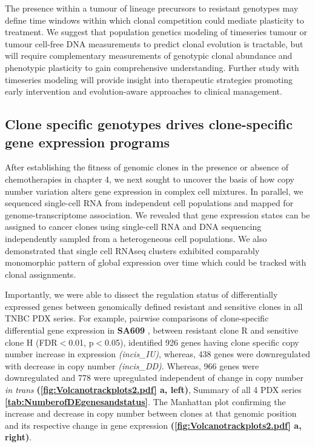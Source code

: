 The presence within a tumour of lineage precursors to resistant genotypes may define time windows within which clonal competition could mediate plasticity to treatment. We suggest that population genetics modeling of timeseries tumour or tumour cell-free DNA measurements to predict clonal evolution is tractable, but will require complementary measurements of genotypic clonal abundance and phenotypic plasticity to gain comprehensive understanding. Further study with timeseries modeling will provide insight into therapeutic strategies promoting early intervention and evolution-aware approaches to clinical management\cite{Acar2020-tf}.
 

\subsection{Clone specific genotypes drives clone-specific gene expression programs}

After establishing the fitness of genomic clones in the presence or absence of chemotherapies in chapter 4, we next sought to uncover the basis of how copy number variation alters gene expression in complex cell mixtures. In parallel, we sequenced single-cell RNA from independent cell populations and mapped for genome-transcriptome association. 
We revealed that gene expression states can be assigned to cancer clones using single-cell RNA and DNA sequencing independently sampled from a heterogeneous cell populations. We also demonstrated that single cell RNAseq clusters exhibited comparably monomorphic pattern of global expression over time which could be tracked with clonal assignments.




Importantly, we were able to dissect the regulation status of  differentially expressed genes between genomically defined resistant and sensitive clones in all TNBC PDX series. For example, pairwise comparisons of clone-specific differential gene expression in \textbf{SA609} , between resistant clone R and sensitive clone H (FDR$<$0.01, p$<$0.05), identified 926 genes having clone specific copy number increase in expression \textit{(incis\_IU)}, whereas, 438 genes were downregulated with decrease in copy number \textit{(incis\_DD)}. Whereas, 966 genes were downregulated and 778 were upregulated  independent of change in copy number \textit{in trans} \textbf{(\autoref{fig:Volcanotrackplots2.pdf} a, left)}, Summary of all 4 PDX series \textbf{\autoref{tab:NumberofDEgenesandstatus}}. The Manhattan plot confirming the increase and decrease in copy number between clones at that genomic position and its respective change in gene expression \textbf{(\autoref{fig:Volcanotrackplots2.pdf} a, right)}.

